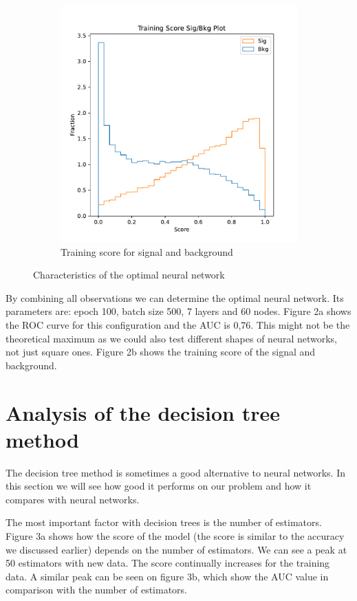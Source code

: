 \documentclass[12pt, a4paper]{article}
\begin{document}
\begin{figure}[h!]
\begin{subfigure}{0.5\textwidth}
  \includegraphics[width=\linewidth]{../graphs/ml-score.pdf}
  \caption{Training score for signal and background} \label{fig:b}
  \end{subfigure}
  \caption{Characteristics of the optimal neural network} \label{fig:1}
\end{figure}

By combining all observations we can determine the optimal neural network. Its parameters are: epoch 100, batch size 500, 7 layers and 60 nodes. Figure 2a shows the ROC curve for this configuration and the AUC is 0,76. This might not be the theoretical maximum as we could also test different shapes of neural networks, not just square ones. Figure 2b shows the training score of the signal and background. 

\section{Analysis of the decision tree method}
The decision tree method is sometimes a good alternative to neural networks. In this section we will see how good it performs on our problem and how it compares with neural networks.

The most important factor with decision trees is the number of estimators. Figure 3a shows how the score of the model (the score is similar to the accuracy we discussed earlier) depends on the number of estimators. We can see a peak at 50 estimators with new data. The score continually increases for the training data. A similar peak can be seen on figure 3b, which show the AUC value in comparison with the number of estimators.
\end{document}
